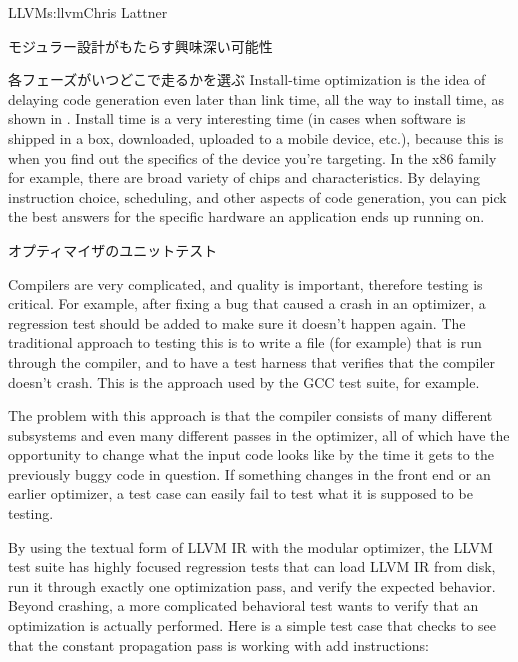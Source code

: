 \begin{aosachapter}{LLVM}{s:llvm}{Chris Lattner}
\begin{aosasect1}{モジュラー設計がもたらす興味深い可能性}
\begin{aosasect2}{各フェーズがいつどこで走るかを選ぶ}
Install-time optimization is the idea of delaying code generation even
later than link time, all the way to install time, as shown in
.  Install time is a very interesting time
(in cases when software is shipped in a box, downloaded, uploaded to a
mobile device, etc.), because this is when you find out the specifics
of the device you're targeting.  In the x86 family for example, there
are broad variety of chips and characteristics.  By delaying
instruction choice, scheduling, and other aspects of code generation,
you can pick the best answers for the specific hardware an application
ends up running on.


\end{aosasect2}

\vspace{-.5cm}
\begin{aosasect2}{オプティマイザのユニットテスト}

Compilers are very complicated, and quality is important, therefore
testing is critical.  For example, after fixing a bug that caused a
crash in an optimizer, a regression test should be added to make sure
it doesn't happen again.  The traditional approach to testing this is
to write a  file (for example) that is run through the
compiler, and to have a test harness that verifies that the compiler
doesn't crash.  This is the approach used by the GCC test suite, for
example.

The problem with this approach is that the compiler consists of many
different subsystems and even many different passes in the optimizer,
all of which have the opportunity to change what the input code looks
like by the time it gets to the previously buggy code in question.  If
something changes in the front end or an earlier optimizer, a test
case can easily fail to test what it is supposed to be testing.

By using the textual form of LLVM IR with the modular optimizer, the
LLVM test suite has highly focused regression tests that can load LLVM
IR from disk, run it through exactly one optimization pass, and verify
the expected behavior.  Beyond crashing, a more complicated behavioral
test wants to verify that an optimization is actually performed.  Here
is a simple test case that checks to see that the constant propagation
pass is working with add instructions:


\end{aosasect2}
\end{aosasect1}
\end{aosachapter}

